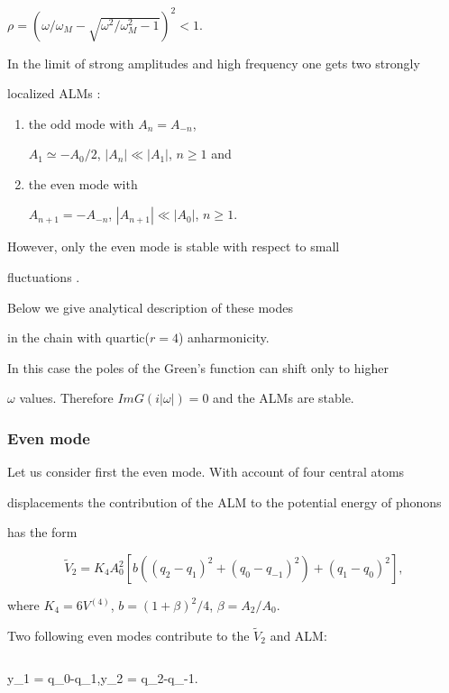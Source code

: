 $\rho = (\omega/\omega_M - \sqrt{\omega^2/\omega_M^2-1})^2 < 1$.

In the limit of strong amplitudes and high frequency one gets two strongly 

localized  ALMs \cite{sivtak,page}: 

\begin{enumerate}

\item the odd mode with $A_n= A_{-n}$,  

$A_1 \simeq -A_0/2$, $|A_n|\ll |A_1|$, $n \ge 1$ and 

\item the even mode with 

$A_{n+1} = -A_{-n}$, $|A_{n+1}| \ll |A_0|$, $n \ge 1$. 

\end{enumerate}

However, only the even mode is stable with respect to small

fluctuations \cite{kissievers}.

Below we give analytical description of these modes

in the chain with quartic($r=4$) anharmonicity.

In this case the poles of the Green's function can shift only to higher

$\omega$ values. Therefore $Im G(i |\omega|) = 0$ and the ALMs are stable.



\subsubsection{Even mode}

Let us consider first the even mode. With account of four central atoms 

displacements the contribution of the ALM to the potential energy of phonons 

has the form 

$$

\tilde{V}_2 = K_4 A_0^2 [b((q_2-q_1)^2+(q_0 -q_{-1})^2)+(q_1 - q_0)^2], 

$$

where $K_4= 6V^{(4)}$, $b=(1+\beta)^2/4$, $\beta = A_2/A_0$.  

Two following even modes contribute to the $\tilde{V}_2 $ and ALM: 

$$

y_1 = {q_0-q_1}{},\quad y_2 = {q_2-q_{-1}}{}.

